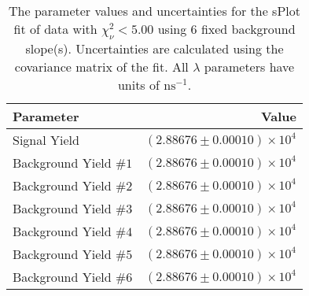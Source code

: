 
\begin{table}
    \begin{center}
        \begin{tabular}{lr}\toprule
            Parameter & Value \\\midrule
            Signal Yield & $(2.88676 \pm 0.00010) \times 10^{4}$ \\
            Background Yield $\#1$ & $(2.88676 \pm 0.00010) \times 10^{4}$ \\
            Background Yield $\#2$ & $(2.88676 \pm 0.00010) \times 10^{4}$ \\
            Background Yield $\#3$ & $(2.88676 \pm 0.00010) \times 10^{4}$ \\
            Background Yield $\#4$ & $(2.88676 \pm 0.00010) \times 10^{4}$ \\
            Background Yield $\#5$ & $(2.88676 \pm 0.00010) \times 10^{4}$ \\
            Background Yield $\#6$ & $(2.88676 \pm 0.00010) \times 10^{4}$ \\\bottomrule
        \end{tabular}
        \caption{The parameter values and uncertainties for the sPlot fit of data with $\chi^2_\nu < 5.00$ using 6 fixed background slope(s). Uncertainties are calculated using the covariance matrix of the fit. All $\lambda$ parameters have units of $\si{\nano\second}^{-1}$.}
    \end{center}
\end{table}
